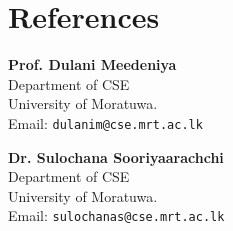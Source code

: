 \vspace{3pt}
\section{References}
\vspace{3pt}
\begin{minipage}{0.48\textwidth}
    \textbf{Prof. Dulani Meedeniya} \\
    Department of CSE \\
    University of Moratuwa. \\
    Email: \texttt{dulanim@cse.mrt.ac.lk}
\end{minipage}
\hfill
\begin{minipage}{0.48\textwidth}
    \textbf{Dr. Sulochana Sooriyaarachchi} \\
    Department of CSE \\
    University of Moratuwa. \\
    Email: \texttt{sulochanas@cse.mrt.ac.lk}
\end{minipage}
